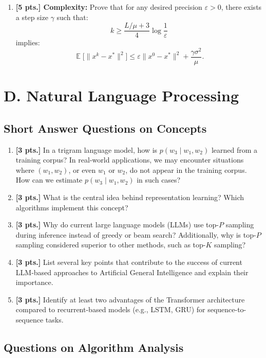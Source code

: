 \documentclass[11pt,a4paper]{article}
\DeclareMathOperator{\E}{\mathbb{E}}
\begin{document}
\begin{enumerate}[label=\textbf{\arabic*.}]
    \item \textbf{[5 pts.] Complexity:} Prove that for any desired precision $\varepsilon > 0$, there exists a step size $\gamma$ such that:
    \[
    k \ge \frac{L/\mu + 3}{4} \log \frac{1}{\varepsilon}
    \]
    implies:
    \[
    \E \bigl[ \|x^k - x^*\|^2 \bigr] \le \varepsilon \|x^0 - x^*\|^2 + \frac{\gamma \sigma^2}{\mu}.
    \]
\end{enumerate}

\section*{D. Natural Language Processing}

\subsection*{Short Answer Questions on Concepts}

\begin{enumerate}[label=\textbf{\arabic*.}]
    \item \textbf{[3 pts.]} In a trigram language model, how is $p(w_3 \mid w_1, w_2)$ learned from a training corpus? In real-world applications, we may encounter situations where $(w_1, w_2)$, or even $w_1$ or $w_2$, do not appear in the training corpus. How can we estimate $p(w_3 \mid w_1, w_2)$ in such cases?

    \item \textbf{[3 pts.]} What is the central idea behind representation learning? Which algorithms implement this concept?

    \item \textbf{[3 pts.]} Why do current large language models (LLMs) use top-$P$ sampling during inference instead of greedy or beam search? Additionally, why is top-$P$ sampling considered superior to other methods, such as top-$K$ sampling?

    \item \textbf{[3 pts.]} List several key points that contribute to the success of current LLM-based approaches to Artificial General Intelligence and explain their importance.

    \item \textbf{[3 pts.]} Identify at least two advantages of the Transformer architecture compared to recurrent-based models (e.g., LSTM, GRU) for sequence-to-sequence tasks.
\end{enumerate}

\subsection*{Questions on Algorithm Analysis}
\end{document}
